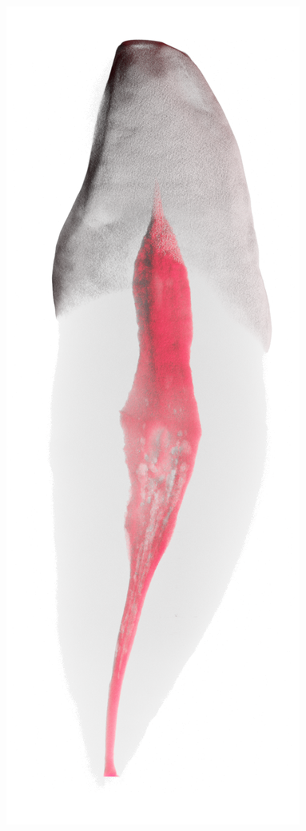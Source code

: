 \begin{frame}
\begin{frame}
		\includegraphics[height=\imageheight]{./images/rcs/Tooth0353}%

\end{frame}
\end{frame}
